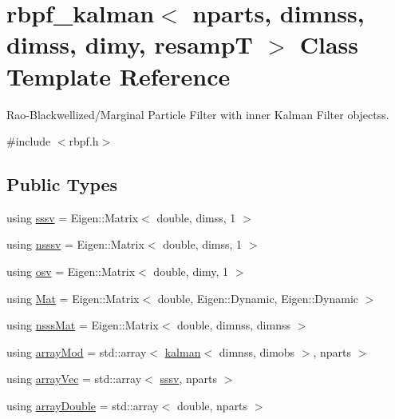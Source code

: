 \hypertarget{classrbpf__kalman}{}\section{rbpf\+\_\+kalman$<$ nparts, dimnss, dimss, dimy, resampT $>$ Class Template Reference}
\label{classrbpf__kalman}


Rao-\/\+Blackwellized/\+Marginal Particle Filter with inner Kalman Filter objectss.  




{\ttfamily \#include $<$rbpf.\+h$>$}

\subsection*{Public Types}
\begin{DoxyCompactItemize}
\item 
using \hyperlink{classrbpf__kalman_a17f2cf0b4ee4a1c8f2bfdb5356c53844}{sssv} = Eigen\+::\+Matrix$<$ double, dimss, 1 $>$
\item 
using \hyperlink{classrbpf__kalman_a887899234c374a04beba9669418577a7}{nsssv} = Eigen\+::\+Matrix$<$ double, dimss, 1 $>$
\item 
using \hyperlink{classrbpf__kalman_a4fdeb1b9b626811569b6ac4327c6cbb2}{osv} = Eigen\+::\+Matrix$<$ double, dimy, 1 $>$
\item 
using \hyperlink{classrbpf__kalman_a042212551b46f72a5d3d58f7073d19ee}{Mat} = Eigen\+::\+Matrix$<$ double, Eigen\+::\+Dynamic, Eigen\+::\+Dynamic $>$
\item 
using \hyperlink{classrbpf__kalman_afa2599778bdaa2419739a838565df672}{nsss\+Mat} = Eigen\+::\+Matrix$<$ double, dimnss, dimnss $>$
\item 
using \hyperlink{classrbpf__kalman_aaf46b726f40b4aaa3be3f225790f76f6}{array\+Mod} = std\+::array$<$ \hyperlink{classkalman}{kalman}$<$ dimnss, dimobs $>$, nparts $>$
\item 
using \hyperlink{classrbpf__kalman_a214378a5c76ff8bfc91cf77bfa523d02}{array\+Vec} = std\+::array$<$ \hyperlink{classrbpf__kalman_a17f2cf0b4ee4a1c8f2bfdb5356c53844}{sssv}, nparts $>$
\item 
using \hyperlink{classrbpf__kalman_a1911a9cc687ba6fe9890e5f448d1626a}{array\+Double} = std\+::array$<$ double, nparts $>$
\end{DoxyCompactItemize}
